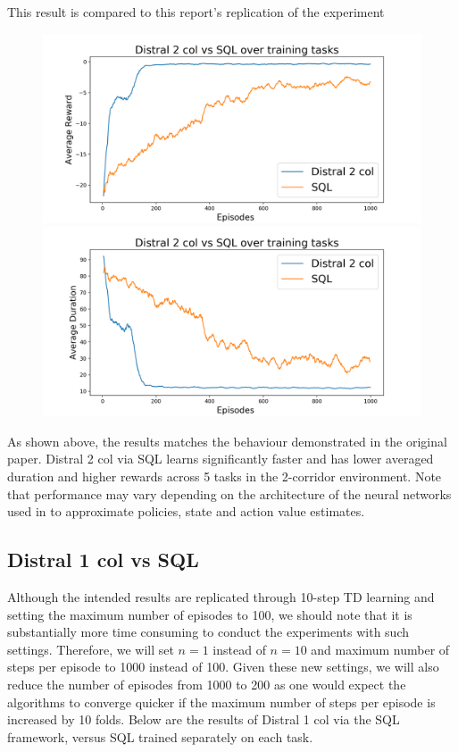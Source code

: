 \documentclass[12pt]{report}
\begin{document}
This result is compared to this report's replication of the experiment
\begin{figure}[H]
\centering
\begin{minipage}{.5\textwidth}
\centering
\includegraphics[width=\textwidth]{figs/distral_2_col_SQL_avg_rwd.png}
\end{minipage}%
\centering
\begin{minipage}{.5\textwidth}
\centering
\includegraphics[width=\textwidth]{figs/distral_2_col_SQL_avg_dur.png}
\end{minipage}%
\end{figure}
As shown above, the results matches the behaviour demonstrated in the original paper. Distral 2 col via SQL learns significantly faster and has lower averaged duration and higher rewards across 5 tasks in the 2-corridor environment. Note that performance may vary depending on the architecture of the neural networks used in to approximate policies, state and action value estimates.

\subsection{Distral 1 col vs SQL}

Although the intended results are replicated through 10-step TD learning and setting the maximum number of episodes to 100, we should note that it is substantially more time consuming to conduct the experiments with such settings. Therefore, we will set $n=1$ instead of $n=10$ and maximum number of steps per episode to 1000 instead of 100. Given these new settings, we will also reduce the number of episodes from 1000 to 200 as one would expect the algorithms to converge quicker if the maximum number of steps per episode is increased by 10 folds. Below are the results of Distral 1 col via the SQL framework, versus SQL trained separately on each task.
\end{document}
